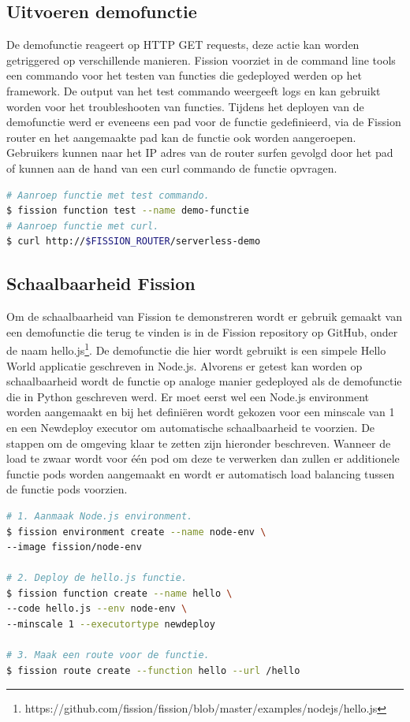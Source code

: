 \subsection{Uitvoeren demofunctie}
De demofunctie reageert op HTTP GET requests, deze actie kan worden getriggered op verschillende manieren. Fission voorziet in de command line tools een commando voor het testen van functies die gedeployed werden op het framework. De output van het test commando weergeeft logs en kan gebruikt worden voor het troubleshooten van functies. Tijdens het deployen van de demofunctie werd er eveneens een pad voor de functie gedefinieerd, via de Fission router en het aangemaakte pad kan de functie ook worden aangeroepen. Gebruikers kunnen naar het IP adres van de router surfen gevolgd door het pad of kunnen aan de hand van een curl commando de functie opvragen.

\begin{lstlisting}[language=bash]
# Aanroep functie met test commando.
$ fission function test --name demo-functie
# Aanroep functie met curl.
$ curl http://$FISSION_ROUTER/serverless-demo
\end{lstlisting}

\subsection{Schaalbaarheid Fission}
Om de schaalbaarheid van Fission te demonstreren wordt er gebruik gemaakt van een demofunctie die terug te vinden is in de Fission repository op GitHub, onder de naam hello.js\footnote{https://github.com/fission/fission/blob/master/examples/nodejs/hello.js}. De demofunctie die hier wordt gebruikt is een simpele Hello World applicatie geschreven in Node.js. Alvorens er getest kan worden op schaalbaarheid wordt de functie op analoge manier gedeployed als de demofunctie die in Python geschreven werd. Er moet eerst wel een Node.js environment worden aangemaakt en bij het definiëren wordt gekozen voor een minscale van 1 en een Newdeploy executor om automatische schaalbaarheid te voorzien. De stappen om de omgeving klaar te zetten zijn hieronder beschreven. Wanneer de load te zwaar wordt voor één pod om deze te verwerken dan zullen er additionele functie pods worden aangemaakt en wordt er automatisch load balancing tussen de functie pods voorzien.

\begin{lstlisting}[language=bash]
# 1. Aanmaak Node.js environment.
$ fission environment create --name node-env \
--image fission/node-env

# 2. Deploy de hello.js functie.
$ fission function create --name hello \
--code hello.js --env node-env \
--minscale 1 --executortype newdeploy

# 3. Maak een route voor de functie.
$ fission route create --function hello --url /hello
\end{lstlisting}

